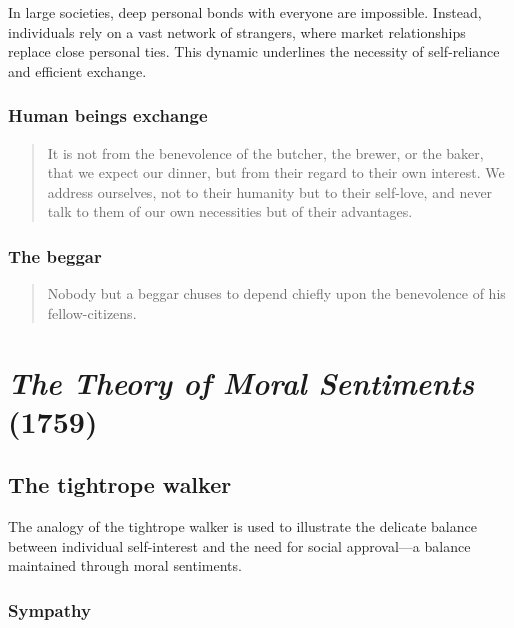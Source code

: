             In large societies, deep personal bonds with everyone are impossible. Instead, individuals rely on a vast network of strangers, where market relationships replace close personal ties. This dynamic underlines the necessity of self-reliance and efficient exchange.

        \subsubsection{Human beings exchange}

            \begin{quote}
                It is not from the benevolence of the butcher, the brewer, or the baker, that we expect our dinner, but from their regard to their own interest. We address ourselves, not to their humanity but to their self-love, and never talk to them of our own necessities but of their advantages.
            \end{quote}

        \subsubsection{The beggar}

            \begin{quote}
                Nobody but a beggar chuses to depend chiefly upon the benevolence of his fellow-citizens.
            \end{quote}

\section{\textit{The Theory of Moral Sentiments} (1759)}

    \subsection{The tightrope walker}

        The analogy of the tightrope walker is used to illustrate the delicate balance between individual self-interest and the need for social approval—a balance maintained through moral sentiments.

        \subsubsection{Sympathy}

